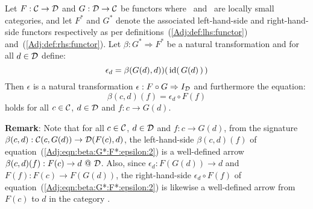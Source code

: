 \begin{prop}\label{Adj:prop:beta:G*:F*:epsilon}
    Let $F:\mbox{$\cal C$}\to\mbox{$\cal D$}$ and $G:\mbox{$\cal D$}\to\mbox{$\cal C$}$ be functors where \Cat\ and \Dat\ 
    are locally small categories, and let $F^{*}$ and $G^{*}$ denote the associated
    left-hand-side and right-hand-side functors respectively as per 
    definitions~(\ref{Adj:def:lhs:functor}) and~(\ref{Adj:def:rhs:functor}). Let
    $\beta:G^{*}\Rightarrow F^{*}$ be a natural transformation and for all
    $d\in\mbox{$\cal D$}$ define:
        \begin{equation}\label{Adj:eqn:beta:G*:F*:epsilon:1}
            \epsilon_{d}=\beta(G(d),d))(\,\mbox{\rm id}(\,G(d)\,)\,)
        \end{equation}
    Then $\epsilon$ is a natural transformation $\epsilon:F\circ G
    \Rightarrow I_{\cal D}$ and furthermore the equation:
        \begin{equation}\label{Adj:eqn:beta:G*:F*:epsilon:2}
            \beta(c,d)(f)=\epsilon_{d}\circ F(f)
        \end{equation}
    holds for all $c\in\mbox{$\cal C$}$, $d\in\mbox{$\cal D$}$ and $f:c\to G(d)$.
\end{prop}
\noindent
{\bf Remark}: Note that for all $c\in\mbox{$\cal C$}$, $d\in\mbox{$\cal D$}$ and $f:c\to G(d)$, from
the signature $\beta(c,d):\mbox{$\cal C$}(c,G(d))\to\mbox{$\cal D$}(F(c),d)$, the left-hand-side
$\beta(c,d)(f)$ of equation~(\ref{Adj:eqn:beta:G*:F*:epsilon:2}) is a well-defined
arrow $\beta(c,d)(f):F(c)\to d\ @\ \mbox{$\cal D$}$. Also, since $\epsilon_{d}:F(G(d))\to d$ 
and $F(f):F(c)\to F(G(d))$, the right-hand-side $\epsilon_{d}\circ F(f)$ of
equation~(\ref{Adj:eqn:beta:G*:F*:epsilon:2}) is likewise a well-defined arrow
from $F(c)$ to $d$ in the category \Dat.

